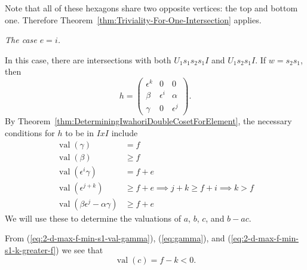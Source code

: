 \documentclass{amsart}
\theoremstyle{definition}
\def\e{\epsilon}
\def\val{\mathop{\mathrm{val}}}
\newcommand\subsubsubsection[1]{\vspace{0.5em}\begin{paragraph}{}\noindent \normalfont\large\itshape #1. \end{paragraph}\vspace{0.5em}}
\begin{document}
  Note that all of these hexagons share two opposite vertices: the top and
  bottom one.  Therefore Theorem~\ref{thm:Triviality-For-One-Intersection}
  applies.

  \subsubsubsection{The case $e = i$}

  In this case, there are intersections with both $U_1 s_1s_2s_1 I$ and $U_1
  s_2s_1 I$.  If $w = s_2s_1$, then
  \begin{equation*}
    h = \begin{pmatrix}
      \e^k & 0 & 0 \\
      \beta & \e^i & \alpha \\
      \gamma & 0 & \e^j
    \end{pmatrix}.
  \end{equation*}
  By Theorem~\ref{thm:DeterminingIwahoriDoubleCosetForElement}, the necessary
  conditions for $h$ to be in $IxI$ include
  \begin{align}
    \label{eq:2-d-max-f-min-s1-val-gamma}
    \val(\gamma) &= f \\
    \label{eq:2-d-max-f-min-s1-val-beta}
    \val(\beta) &\ge f \\
    \label{eq:2-d-max-f-min-s1-minor-equality}
    \val(\e^i\gamma) &= f + e \\
    \label{eq:2-d-max-f-min-s1-k-greater-f}
    \val(\e^{j+k}) &\ge f + e \implies j + k \ge f + i \implies k > f \\
    \label{eq:2-d-max-f-min-s1-val-minor}
    \val(\beta\e^j - \alpha\gamma) &\ge f + e
  \end{align}
  We will use these to determine the valuations of $a$, $b$, $c$, and $b-ac$.

  From (\ref{eq:2-d-max-f-min-s1-val-gamma}), (\ref{eq:gamma}), and
  (\ref{eq:2-d-max-f-min-s1-k-greater-f}) we see that
  \begin{equation}
    \label{eq:2-d-max-f-min-s1-val-c}
    \val(c) = f - k < 0.
  \end{equation}
\end{document}
